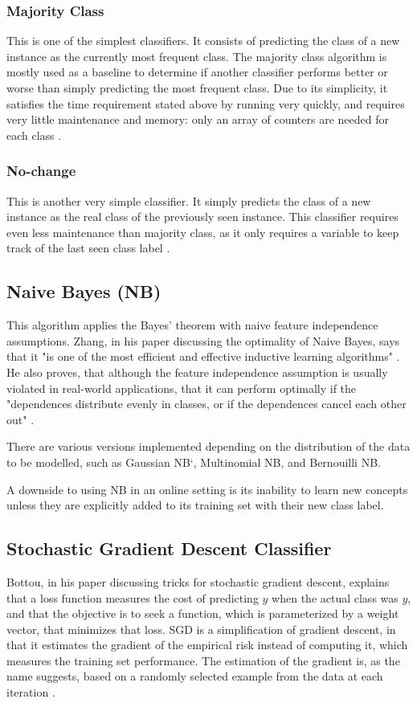 \subsubsection{Majority Class}
This is one of the simplest classifiers. It consists of predicting the class of a new instance as the currently most frequent class. The majority class algorithm is mostly used as a baseline to determine if another classifier performs better or worse than simply predicting the most frequent class. Due to its simplicity, it satisfies the time requirement stated above by running very quickly, and requires very little maintenance and memory: only an array of counters are needed for each class \cite{bifet2018machine}.

\subsubsection{No-change}
This is another very simple classifier. It simply predicts the class of a new instance as the real class of the previously seen instance. This classifier requires even less maintenance than majority class, as it only requires a variable to keep track of the last seen class label \cite{bifet2018machine}.

\subsection{Naive Bayes (NB)}
This algorithm applies the Bayes' theorem with naive feature independence assumptions. Zhang, in his paper discussing the optimality of Naive Bayes, says that it "is one of the most efficient and effective inductive learning algorithms" \cite{zhang2004optimality}. He also proves, that although the feature independence assumption is usually violated in real-world applications, that it can perform optimally if the "dependences distribute evenly in classes, or if the dependences cancel each other out" \cite{zhang2004optimality}.

There are various versions implemented depending on the distribution of the data to be modelled, such as Gaussian NB`, Multinomial NB, and Bernouilli NB.

A downside to using NB in an online setting is its inability to learn new concepts unless they are explicitly added to its training set with their new class label.

\subsection{Stochastic Gradient Descent Classifier}
Bottou, in his paper discussing tricks for stochastic gradient descent, explains that a loss function measures the cost of predicting $\hat{y}$ when the actual class was $y$, and that the objective is to seek a function, which is parameterized by a weight vector, that minimizes that loss.
SGD is a simplification of gradient descent, in that it estimates the gradient of the empirical risk instead of computing it, which measures the training set performance. The estimation of the gradient is, as the name suggests, based on a randomly selected example from the data at each iteration \cite{bottou2012stochastic}.

